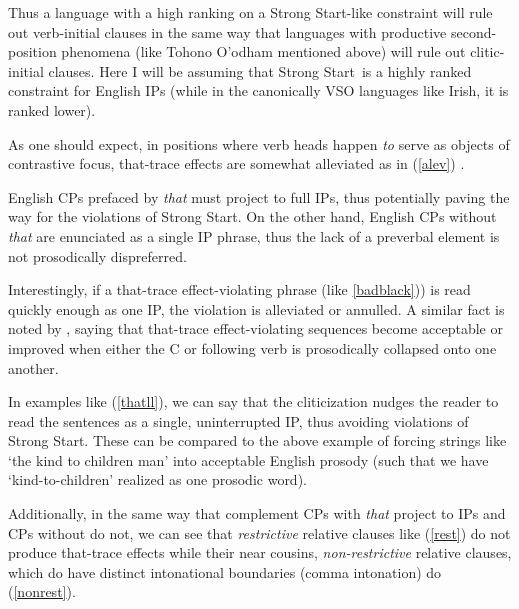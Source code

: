 \documentclass{article}
\newcommand{\Ss}{Strong Start}
\newcommand{\TT}{that-trace effect}
\begin{document}
Thus a language with a high ranking on a \Ss-like constraint will rule out verb-initial clauses in the same way that languages with productive second-position phenomena (like Tohono O'odham mentioned above) will rule out clitic-initial clauses. Here I will be assuming that \Ss\ is a highly ranked constraint for English IPs (while in the canonically VSO languages like Irish, it is ranked lower). 

As one should expect, in positions where verb heads happen \emph{to} serve as objects of contrastive focus, \TT{s} are somewhat alleviated as in (\ref{alev}) \citep{kandybowicz06}.

\begin{exe}
\label{alev}
\end{exe}


English CPs prefaced by \emph{that} must project to full IPs, thus potentially paving the way for the violations of \Ss. On the other hand, English CPs without \emph{that} are enunciated as a single IP phrase, thus the lack of a preverbal element is not prosodically dispreferred.

Interestingly, if a \TT-violating phrase (like \ref{badblack})) is read quickly enough as one IP, the violation is alleviated or annulled. A similar fact is noted by \citet{kandybowicz06}, saying that \TT-violating sequences become acceptable or improved when either the C or following verb is prosodically collapsed onto one another.



\begin{exe}
\ex\label{thatll}\begin{xlist}
\end{xlist}
\end{exe}

In examples like (\ref{thatll}), we can say that the cliticization nudges the reader to read the sentences as a single, uninterrupted IP, thus avoiding violations of \Ss. These can be compared to the above example of forcing strings like `the kind to children man' into acceptable English prosody (such that we have `kind-to-children' realized as one prosodic word).

Additionally, in the same way that complement CPs with \textit{that} project to IPs and CPs without do not, we can see that \emph{restrictive} relative clauses like (\ref{rest}) do not produce \TT{s} while their near cousins, \emph{non-restrictive} relative clauses, which do have distinct intonational boundaries (comma intonation) do (\ref{nonrest}).
\end{document}

